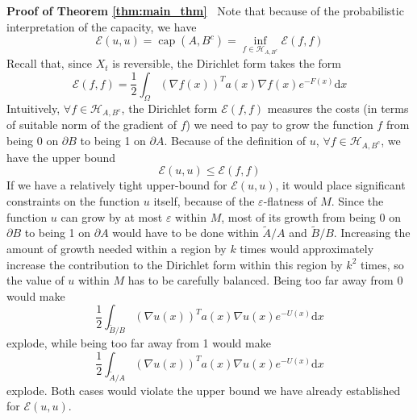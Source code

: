 \documentclass[english, aip, jcp, priprint, graphicx,floatfix]{revtex4-1}
\newcommand{\mathd}{\mathrm{d}}
\newcommand{\tmop}[1]{\ensuremath{\operatorname{#1}}}
\theoremstyle{plain}
\theoremstyle{definition}
\theoremstyle{plain}
\begin{document}
\noindent\textbf{Proof of Theorem \ref{thm:main_thm}\ }
Note that because of the probabilistic interpretation of the capacity, we have
\[ \mathcal{E} (u, u) = \tmop{cap} (A, B^c) = \inf_{f \in \mathcal{H}_{A, B^c}} \mathcal{E} (f, f) \]
Recall that, since $X_t$ is reversible, the Dirichlet form takes the form
\[ \mathcal{E} (f, f) = \frac{1}{2} \int_{\Omega} (\nabla f (x))^T a
(x) \nabla f (x) e^{- F (x)} \mathd x \]
Intuitively, $\forall f \in \mathcal{H}_{A, B^c}$, the Dirichlet form $\mathcal{E} (f, f)$ measures the costs (in terms of suitable norm of the gradient of $f$) we need to pay to grow the function $f$ from being 0 on $\partial B$ to being 1 on $\partial A$. Because of the definition of $u$, $\forall f \in \mathcal{H}_{A, B^c}$, we have the upper bound \[ \mathcal{E} (u, u) \leqslant \mathcal{E} (f, f) \] If we have a relatively tight upper-bound for $\mathcal{E} (u, u)$, it would place significant constraints on the function $u$ itself, because of the $\varepsilon$-flatness of $M$. Since the function $u$ can grow by at most $\varepsilon$ within $M$, most of its growth from being $0$ on $\partial B$ to being 1 on $\partial A$ would have to be done within $\tilde{A} / A$ and $\tilde{B} / B$. Increasing the amount of growth needed within a region by $k$ times would approximately increase the contribution to the Dirichlet form within this region by $k^2$ times, so the value of $u$ within $M$ has to be carefully balanced. Being too far away from 0 would make
\[ \frac{1}{2} \int_{\tilde{B} / B} (\nabla u (x))^T a (x) \nabla u (x) e^{- U (x)} \mathd x \]
explode, while being too far away from 1 would make
\[ \frac{1}{2} \int_{\tilde{A} / A} (\nabla u (x))^T a (x) \nabla u (x) e^{- U (x)} \mathd x \]
explode. Both cases would violate the upper bound we have already established for $\mathcal{E} (u, u)$.
\end{document}
